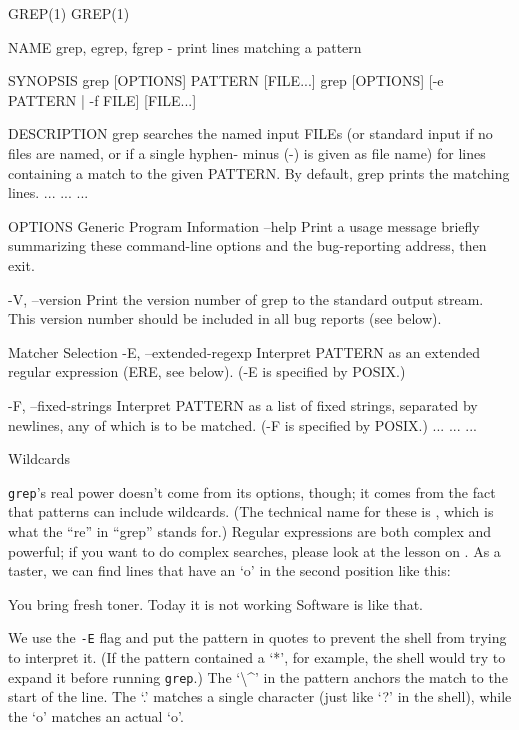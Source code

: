 \begin{VerbOut}
GREP(1)                                                                                              GREP(1)

NAME
grep, egrep, fgrep - print lines matching a pattern

SYNOPSIS
grep [OPTIONS] PATTERN [FILE...]
grep [OPTIONS] [-e PATTERN | -f FILE] [FILE...]

DESCRIPTION
grep  searches the named input FILEs (or standard input if no files are named, or if a single hyphen-
minus (-) is given as file name) for lines containing a match to the given PATTERN.  By default, grep
prints the matching lines.
...        ...        ...

OPTIONS
Generic Program Information
--help Print  a  usage  message  briefly summarizing these command-line options and the bug-reporting
address, then exit.

-V, --version
Print the version number of grep to the standard output stream.  This version number should be
included in all bug reports (see below).

Matcher Selection
-E, --extended-regexp
Interpret  PATTERN  as  an  extended regular expression (ERE, see below).  (-E is specified by
POSIX.)

-F, --fixed-strings
Interpret PATTERN as a list of fixed strings, separated by newlines, any of  which  is  to  be
matched.  (-F is specified by POSIX.)
...        ...        ...
\end{VerbOut}

\begin{swcbox}{Wildcards}

\texttt{grep}'s real power doesn't come from its options, though; it
comes from the fact that patterns can include wildcards. (The technical
name for these is ,
which is what the ``re'' in ``grep'' stands for.) Regular expressions
are both complex and powerful; if you want to do complex searches,
please look at the lesson on . As a taster, we can find lines that have an `o' in the second
position like this:


\begin{VerbOut}
You bring fresh toner.
Today it is not working
Software is like that.
\end{VerbOut}

We use the \texttt{-E} flag and put the pattern in quotes to prevent the
shell from trying to interpret it. (If the pattern contained a `*', for
example, the shell would try to expand it before running \texttt{grep}.)
The `\textbackslash{}\^{}' in the pattern anchors the match to the start
of the line. The `.' matches a single character (just like `?' in the
shell), while the `o' matches an actual `o'.

\end{swcbox}

